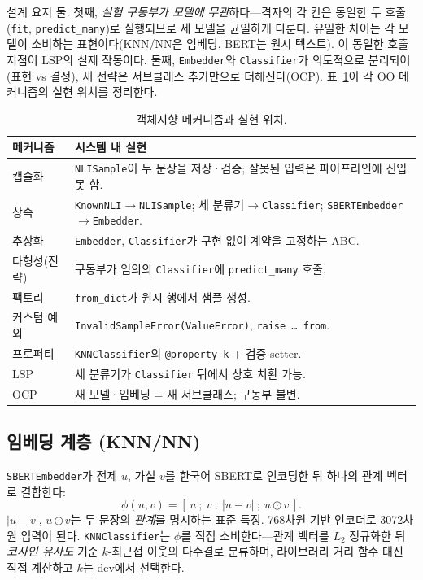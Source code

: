 \documentclass[conference]{IEEEtran}
\begin{document}
설계 요지 둘. 첫째, \emph{실험 구동부가 모델에 무관}하다---격자의 각 칸은
동일한 두 호출(\texttt{fit}, \texttt{predict\_many})로 실행되므로 세 모델을
균일하게 다룬다. 유일한 차이는 각 모델이 소비하는 표현이다(KNN/NN은 임베딩,
BERT는 원시 텍스트). 이 동일한 호출 지점이 LSP의 실제 작동이다. 둘째,
\texttt{Embedder}와 \texttt{Classifier}가 의도적으로 분리되어(표현 vs 결정),
새 전략은 서브클래스 추가만으로 더해진다(OCP). 표~\ref{tab:oop}이 각 OO
메커니즘의 실현 위치를 정리한다.

\begin{table}[t]
\centering\footnotesize
\caption{객체지향 메커니즘과 실현 위치.}
\label{tab:oop}
\begin{tabular}{@{}>{\raggedright\arraybackslash}p{2.1cm}p{5.5cm}@{}}
\toprule
메커니즘 & 시스템 내 실현 \\
\midrule
캡슐화 & \texttt{NLISample}이 두 문장을 저장·검증; 잘못된 입력은 파이프라인에 진입 못 함. \\
상속 & \texttt{KnownNLI}$\rightarrow$\texttt{NLISample}; 세 분류기$\rightarrow$\texttt{Classifier}; \texttt{SBERTEmbedder}$\rightarrow$\texttt{Embedder}. \\
추상화 & \texttt{Embedder}, \texttt{Classifier}가 구현 없이 계약을 고정하는 ABC. \\
다형성(전략) & 구동부가 임의의 \texttt{Classifier}에 \texttt{predict\_many} 호출. \\
팩토리 & \texttt{from\_dict}가 원시 행에서 샘플 생성. \\
커스텀 예외 & \texttt{InvalidSampleError(ValueError)}, \texttt{raise\,\ldots\,from}. \\
프로퍼티 & \texttt{KNNClassifier}의 \texttt{@property k} + 검증 setter. \\
LSP & 세 분류기가 \texttt{Classifier} 뒤에서 상호 치환 가능. \\
OCP & 새 모델·임베딩 = 새 서브클래스; 구동부 불변. \\
\bottomrule
\end{tabular}
\end{table}

\subsection{임베딩 계층 (KNN/NN)}
\texttt{SBERTEmbedder}가 전제 $u$, 가설 $v$를 한국어 SBERT로 인코딩한 뒤
하나의 관계 벡터로 결합한다:
\begin{equation}
\phi(u,v) = [\,u\ ;\ v\ ;\ |u-v|\ ;\ u\odot v\,].
\end{equation}
$|u-v|$, $u\odot v$는 두 문장의 \emph{관계}를 명시하는 표준 특징. 768차원 기반
인코더로 3072차원 입력이 된다. \texttt{KNNClassifier}는 $\phi$를 직접 소비한다---관계
벡터를 $L_2$ 정규화한 뒤 \emph{코사인 유사도} 기준 $k$-최근접 이웃의 다수결로 분류하며,
라이브러리 거리 함수 대신 직접 계산하고 $k$는 dev에서 선택한다.
\end{document}
